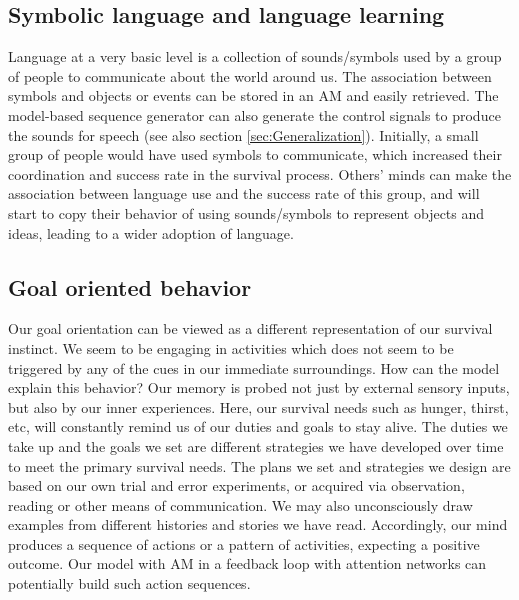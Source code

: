 \documentclass[reprint,amsmath,amssymb,apr,aip,onecolumn, 11pt]{revtex4-1}
\begin{document}
\subsection{Symbolic language and language learning}

Language at a very basic level is a collection of sounds/symbols used by a group of people to communicate about the world around us. The association between symbols and objects or events can be stored in an AM and easily retrieved. The model-based sequence generator can also generate the control signals to produce the sounds for speech (see also section \ref{sec:Generalization}). Initially, a small group of people would have used symbols to communicate, which increased their coordination and success rate in the survival process. Others' minds can make the association between language use and the success rate of this group, and will start to copy their behavior of using sounds/symbols to represent objects and ideas, leading to a wider adoption of language. 

\subsection{Goal oriented behavior}
Our goal orientation can be viewed as a different representation of our survival instinct. We seem to be engaging in activities which does not seem to be triggered by any of the cues in our immediate surroundings. How can the model explain this behavior? Our memory is probed not just by external sensory inputs, but also by our inner experiences. Here, our survival needs such as hunger, thirst, etc, will constantly remind us of our duties and goals to stay alive. The duties we take up and the goals we set are different strategies we have developed over time to meet the primary survival needs. The plans we set and strategies we design are based on our own trial and error experiments, or acquired via observation, reading or other means of communication. We may also unconsciously draw examples from different histories and stories we have read. Accordingly, our mind produces a sequence of actions or a pattern of activities, expecting a positive outcome. Our model with AM in a feedback loop with attention networks can potentially build such action sequences.  
\end{document}
